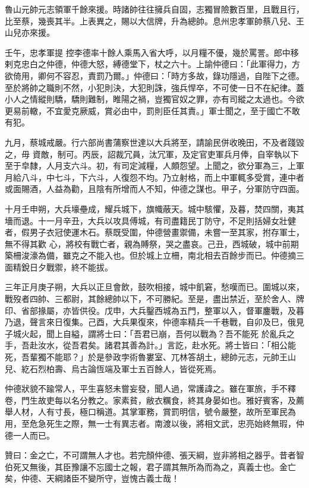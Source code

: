 \begin{pinyinscope}
 魯山元帥元志領軍千餘來援。時諸帥往往擁兵自固，志獨冒險數百里，且戰且行，比至蔡，幾喪其半。上表異之，賜以大信牌，升為總帥。息州忠孝軍帥蔡八兒、王山兒亦來援。



 壬午，忠孝軍提
 控李德率十餘人乘馬入省大呼，以月糧不優，幾於罵詈。郎中移剌克忠白之仲德，仲德大怒，縛德堂下，杖之六十。上諭仲德曰：「此軍得力，方欲倚用，卿何不容忍，責罰乃爾。」仲德曰：「時方多故，錄功隱過，自陛下之德。至於將帥之職則不然，小犯則決，大犯則誅，強兵悍卒，不可使一日不在紀律。蓋小人之情縱則驕，驕則難制，睢陽之禍，豈獨官奴之罪，亦有司縱之太過也。今欲更易前轍，不宜愛克厥威，賞必由中，罰則臣任其責。」軍士聞之，至于國亡不敢有犯。



 九月，蔡城戒嚴。行六部尚書蒲察世達以大兵將至，請諭民併收晚田，不及者踐毀之，毋
 資敵，制可。丙辰，詔裁冗員，汰冗軍，及定官吏軍兵月俸，自宰執以下至于皁隸，人月支六斗。初，有司定減糧，人頗怨望。上聞之，欲分軍為三，上軍月給八斗，中七斗，下六斗，人復怨不均。乃立射格，而上中軍輒多受賞，連中者或面賜酒，人益為勸，且陰有所增而人不知，仲德之謀也。甲子，分軍防守四面。



 十月壬申朔，大兵壕壘成，耀兵城下，旗幟蔽天。城中駭懼，及暮，焚四關，夷其墻而退。十一月辛丑，大兵以攻具傅城，有司盡籍民丁防守，不足則括婦女壯健者，假男子衣冠使運木石。蔡既受圍，仲德營畫禦備，未嘗一至其家，拊存軍士，無不得其歡
 心，將校有戰亡者，親為賻祭，哭之盡哀。己丑，西城破，城中前期築柵浚濠為備，雖克之不能入也。但於城上立柵，南北相去百餘步而已。仲德摘三面精銳日夕戰禦，終不能拔。



 三年正月庚子朔，大兵以正旦會飲，鼓吹相接，城中飢窘，愁嘆而已。圍城以來，戰歿者四帥、三都尉，其餘總帥以下，不可勝紀。至是，盡出禁近，至於舍人、牌印、省部掾屬，亦皆供役。戊申，大兵鑿西城為五門，整軍以入，督軍鏖戰，及暮乃退，聲言來日復集。己酉，大兵果復來，仲德率精兵一千巷戰，自卯及巳，俄見子城火起，聞上自縊，謂將士曰：「吾君已崩，吾何以戰為？吾不能死
 於亂兵之手，吾赴汝水，從吾君矣。諸君其善為計。」言訖，赴水死。將士皆曰：「相公能死，吾輩獨不能耶？」於是參政孛術魯婁室、兀林答胡土，總帥元志，元帥王山兒、紇石烈柏壽、烏古論恆端及軍士五百餘人，皆從死焉。



 仲德狀貌不踰常人，平生喜怒未嘗妄發，聞人過，常護諱之。雖在軍旅，手不釋卷，門生故吏每以名分教之。家素貧，敝衣糲食，終其身晏如也。雅好賓客，及薦舉人材，人有寸長，極口稱道。其掌軍務，賞罰明信，號令嚴整，故所至軍民為用，至危急死生之際，無一士有異志者。南渡以後，將相文武，忠亮始終無瑕，仲德一人而已。



 贊曰：金之亡，不可謂無人才也。若完顏仲德、張天綱，豈非將相之器乎。昔者智伯死又無後，其臣豫讓不忘國士之報，君子謂其無所為而為之，真義士也。金亡矣，仲德、天綱諸臣不變所守，豈愧古義士哉！



\end{pinyinscope}